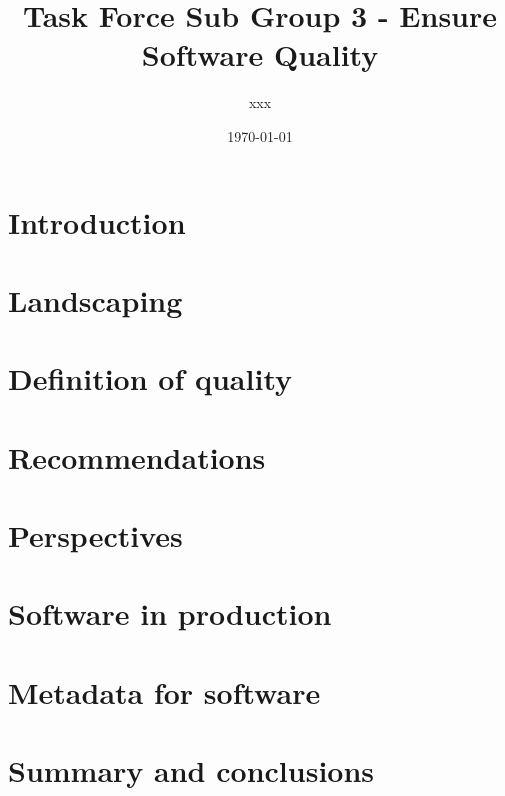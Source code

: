 \documentclass[a4paper]{article}
\title{Task Force Sub Group 3 - Ensure Software Quality}
\author{xxx}
\date{\today}
\begin{document}
\maketitle

\tableofcontents

\section{Introduction}


\section{Landscaping}


\section{Definition of quality}


\section{Recommendations}


\section{Perspectives}


\section{Software in production}


\section{Metadata for software}


\section{Summary and conclusions}


\printbibliography
\end{document}
